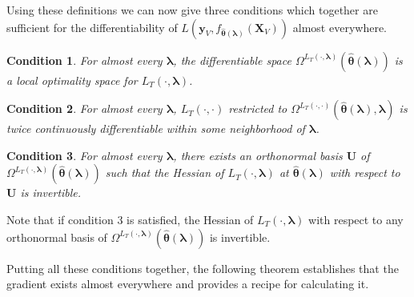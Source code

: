 \documentclass[12pt]{article}
\newtheorem{condition}{Condition}
\begin{document}
Using these definitions we can now give three conditions which together are sufficient for the differentiability of $L \left( \boldsymbol{y}_V, f_{\hat{\boldsymbol \theta}(\boldsymbol{\lambda})}(\boldsymbol{X}_V) \right )$ almost everywhere.

\begin{condition}
For almost every $\boldsymbol{\lambda}$, the differentiable space $\Omega^{L_T(\cdot, \boldsymbol{\lambda})}(\hat{\boldsymbol \theta}\left(\boldsymbol{\lambda}\right))$ is a local optimality space for $L_T\left(\cdot,\boldsymbol{\lambda}\right)$.
\label{condn:local_is_diff}
\end{condition}

\begin{condition}
For almost every $\boldsymbol{\lambda}$, $L_T\left(\cdot, \cdot\right)$ restricted to $\Omega^{L_T(\cdot, \cdot)}(\hat{\boldsymbol \theta}\left(\boldsymbol{\lambda}\right), \boldsymbol{\lambda})$ is twice continuously differentiable within some neighborhood of $\boldsymbol{\lambda}$.
\label{condn:twice_diff}
\end{condition}

\begin{condition}
For almost every $\boldsymbol{\lambda}$, there exists an orthonormal basis $\boldsymbol U$ of $\Omega^{L_T(\cdot, \boldsymbol{\lambda})}(\hat{\boldsymbol \theta}\left(\boldsymbol{\lambda}\right))$ such that the Hessian of $L_T\left(\cdot, \boldsymbol{\lambda}\right)$ at $\hat{\boldsymbol \theta}\left(\boldsymbol{\lambda}\right)$ with respect to $\boldsymbol U$ is invertible.
\label{condn:hessian}
\end{condition}
Note that if condition 3 is satisfied, the Hessian of $L_T \left(\cdot, \boldsymbol{\lambda}\right)$ with respect to any orthonormal basis of $\Omega^{L_T(\cdot, \boldsymbol{\lambda})}(\hat{\boldsymbol \theta}\left(\boldsymbol{\lambda}\right))$ is invertible.

Putting all these conditions together, the following theorem establishes that the gradient exists almost everywhere and provides a recipe for calculating it.
\end{document}
